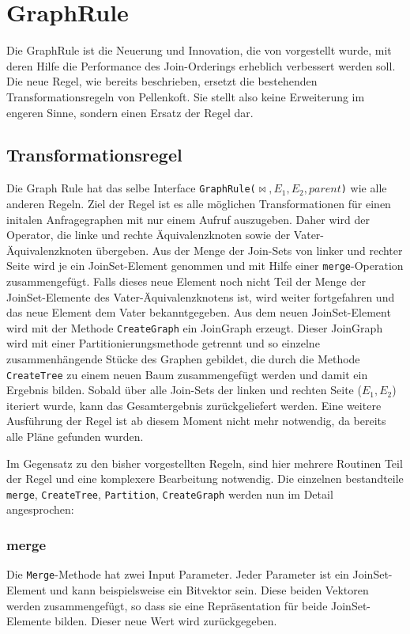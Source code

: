 \section{GraphRule}

Die GraphRule ist die Neuerung und Innovation, die von \cite{shanbhag2014optimizing} vorgestellt wurde, mit deren Hilfe die Performance des Join-Orderings erheblich verbessert werden soll. Die neue Regel, wie bereits beschrieben, ersetzt die bestehenden Transformationsregeln von Pellenkoft. Sie stellt also keine Erweiterung im engeren Sinne, sondern einen Ersatz der Regel dar.

\subsection{Transformationsregel}


Die Graph Rule hat das selbe Interface \texttt{GraphRule($\Join, E_1, E_2, parent$)} wie alle anderen Regeln. Ziel der Regel ist es alle möglichen Transformationen für einen initalen Anfragegraphen mit nur einem Aufruf auszugeben. Daher wird der Operator, die linke und rechte Äquivalenzknoten sowie der Vater-Äquivalenzknoten übergeben. Aus der Menge der Join-Sets von linker und rechter Seite wird je ein JoinSet-Element genommen und mit Hilfe einer \texttt{merge}-Operation zusammengefügt. Falls dieses neue Element noch nicht Teil der Menge der JoinSet-Elemente des Vater-Äquivalenzknotens ist, wird weiter fortgefahren und das neue Element dem Vater bekanntgegeben. Aus dem neuen JoinSet-Element wird mit der Methode \texttt{CreateGraph} ein JoinGraph erzeugt. Dieser JoinGraph wird mit einer Partitionierungsmethode getrennt und so einzelne zusammenhängende Stücke des Graphen gebildet, die durch die Methode \texttt{CreateTree} zu einem neuen Baum zusammengefügt werden und damit ein Ergebnis bilden. Sobald über alle Join-Sets der linken und rechten Seite ($E_1, E_2$) iteriert wurde, kann das Gesamtergebnis zurückgeliefert werden. Eine weitere Ausführung der Regel ist ab diesem Moment nicht mehr notwendig, da bereits alle Pläne gefunden wurden.


Im Gegensatz zu den bisher vorgestellten Regeln, sind hier mehrere Routinen Teil der Regel und eine komplexere Bearbeitung notwendig. Die einzelnen bestandteile \texttt{merge}, \texttt{CreateTree}, \texttt{Partition}, \texttt{CreateGraph} werden nun im Detail angesprochen:


\subsubsection{merge}

Die \texttt{Merge}-Methode hat zwei Input Parameter. Jeder Parameter ist ein JoinSet-Element und kann beispielsweise ein Bitvektor sein. Diese beiden Vektoren werden zusammengefügt, so dass sie eine Repräsentation für beide JoinSet-Elemente bilden. Dieser neue Wert wird zurückgegeben.


